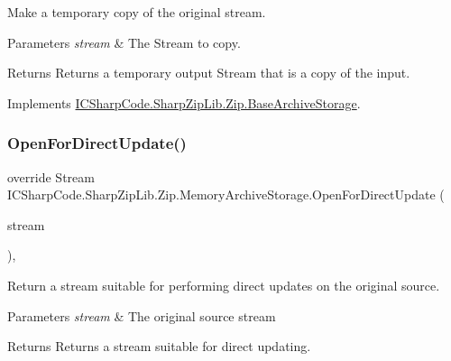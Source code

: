 Make a temporary copy of the original stream. 


\begin{DoxyParams}{Parameters}
{\em stream} & The Stream to copy.\\
\hline
\end{DoxyParams}
\begin{DoxyReturn}{Returns}
Returns a temporary output Stream that is a copy of the input.
\end{DoxyReturn}


Implements \hyperlink{class_i_c_sharp_code_1_1_sharp_zip_lib_1_1_zip_1_1_base_archive_storage_a3580cacd0a0e6b3045bdeeaed72cb492}{I\+C\+Sharp\+Code.\+Sharp\+Zip\+Lib.\+Zip.\+Base\+Archive\+Storage}.

\mbox{\label{class_i_c_sharp_code_1_1_sharp_zip_lib_1_1_zip_1_1_memory_archive_storage_af536ce3c423efbc86e645382bc588deb}} 
\subsubsection{\texorpdfstring{Open\+For\+Direct\+Update()}{OpenForDirectUpdate()}}
{\footnotesize\ttfamily override Stream I\+C\+Sharp\+Code.\+Sharp\+Zip\+Lib.\+Zip.\+Memory\+Archive\+Storage.\+Open\+For\+Direct\+Update (\begin{DoxyParamCaption}\item[{Stream}]{stream }\end{DoxyParamCaption})\hspace{0.3cm}{\ttfamily [inline]}, {\ttfamily [virtual]}}



Return a stream suitable for performing direct updates on the original source. 


\begin{DoxyParams}{Parameters}
{\em stream} & The original source stream\\
\hline
\end{DoxyParams}
\begin{DoxyReturn}{Returns}
Returns a stream suitable for direct updating.
\end{DoxyReturn}


